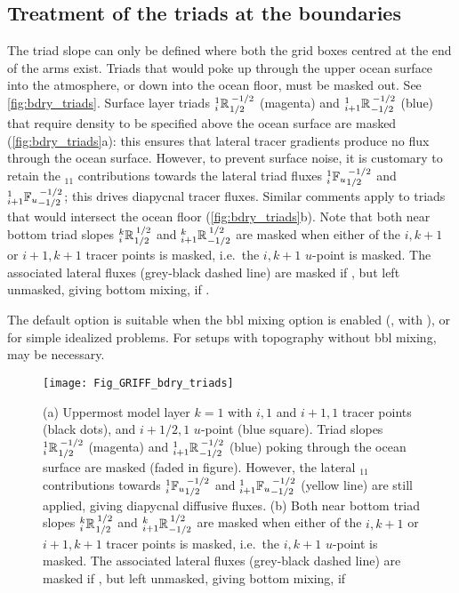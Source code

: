\documentclass[../tex_main/NEMO_manual]{subfiles}
\begin{document}
\subsection{Treatment of the triads at the boundaries}\label{sec:iso_bdry}
The triad slope can only be defined where both the grid boxes centred at
the end of the arms exist. Triads that would poke up
through the upper ocean surface into the atmosphere, or down into the
ocean floor, must be masked out. See \autoref{fig:bdry_triads}. Surface layer triads
$\triad{i}{1}{R}{1/2}{-1/2}$ (magenta) and
$\triad{i+1}{1}{R}{-1/2}{-1/2}$ (blue) that require density to be
specified above the ocean surface are masked (\autoref{fig:bdry_triads}a): this ensures that lateral
tracer gradients produce no flux through the ocean surface. However,
to prevent surface noise, it is customary to retain the $_{11}$ contributions towards
the lateral triad fluxes $\triad[u]{i}{1}{F}{1/2}{-1/2}$ and
$\triad[u]{i+1}{1}{F}{-1/2}{-1/2}$; this drives diapycnal tracer
fluxes. Similar comments apply to triads that would intersect the
ocean floor (\autoref{fig:bdry_triads}b). Note that both near bottom
triad slopes $\triad{i}{k}{R}{1/2}{1/2}$ and
$\triad{i+1}{k}{R}{-1/2}{1/2}$ are masked when either of the $i,k+1$
or $i+1,k+1$ tracer points is masked, i.e.\ the $i,k+1$ $u$-point is
masked. The associated lateral fluxes (grey-black dashed line) are
masked if , but left unmasked,
giving bottom mixing, if .

The default option  is suitable when the
bbl mixing option is enabled (, with ),
or  for simple idealized  problems. For setups with topography without
bbl mixing,  may be necessary.
\begin{figure}[h] \begin{center}
    \texttt{[image: Fig\_GRIFF\_bdry\_triads]}
    \caption{  \protect\label{fig:bdry_triads}
      (a) Uppermost model layer $k=1$ with $i,1$ and $i+1,1$ tracer
      points (black dots), and $i+1/2,1$ $u$-point (blue square). Triad
      slopes $\triad{i}{1}{R}{1/2}{-1/2}$ (magenta) and $\triad{i+1}{1}{R}{-1/2}{-1/2}$
      (blue) poking through the ocean surface are masked (faded in
      figure). However, the lateral $_{11}$ contributions towards
      $\triad[u]{i}{1}{F}{1/2}{-1/2}$ and $\triad[u]{i+1}{1}{F}{-1/2}{-1/2}$
      (yellow line) are still applied, giving diapycnal diffusive
      fluxes.\newline
      (b) Both near bottom triad slopes $\triad{i}{k}{R}{1/2}{1/2}$ and
      $\triad{i+1}{k}{R}{-1/2}{1/2}$ are masked when either of the $i,k+1$
      or $i+1,k+1$ tracer points is masked, i.e.\ the $i,k+1$ $u$-point
      is masked. The associated lateral fluxes (grey-black dashed
      line) are masked if \protect{}, but left
      unmasked, giving bottom mixing, if \protect{}}
 \end{center} \end{figure}
\end{document}
